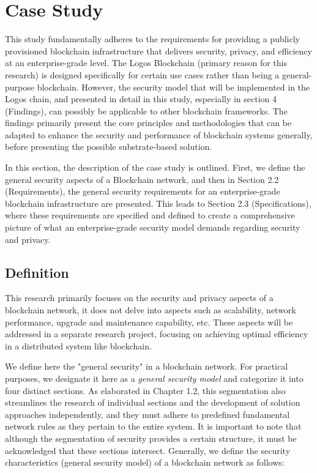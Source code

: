 \section{Case Study}
This study fundamentally adheres to the requirements for providing a publicly provisioned blockchain infrastructure that delivers security, privacy, and efficiency at an enterprise-grade level. The Logos Blockchain (primary reason for this research) is designed specifically for certain use cases rather than being a general-purpose blockchain. However, the security model that will be implemented in the Logos chain, and presented in detail in this study, especially in section 4 (Findings), can possibly be applicable to other blockchain frameworks. The findings primarily present the core principles and methodologies that can be adapted to enhance the security and performance of blockchain systems generally, before presenting the possible substrate-based solution.

In this section, the description of the case study is outlined. First, we define the general security aspects of a Blockchain network, and then in Section 2.2 (Requirements), the general security requirements for an enterprise-grade blockchain infrastructure are presented. This leads to Section 2.3 (Specifications), where these requirements are specified and defined to create a comprehensive picture of what an enterprise-grade security model demands regarding security and privacy.

\subsection{Definition}
This research primarily focuses on the security and privacy aspects of a blockchain network\cite{block_secure_blog}, it does not delve into aspects such as scalability, network performance, upgrade and maintenance capability, etc. These aspects will be addressed in a separate research project, focusing on achieving optimal efficiency in a distributed system like blockchain.

We define here the "general security" in a blockchain network. For practical purposes, we designate it here as a \textit{general security model} and categorize it into four distinct sections. As elaborated in Chapter 1.2, this segmentation also streamlines the research of individual sections and the development of solution approaches independently, and they must adhere to predefined fundamental network rules as they pertain to the entire system. It is important to note that although the segmentation of security provides a certain structure, it must be acknowledged that these sections intersect.
Generally, we define the security characteristics (general security model) of a blockchain network as follows:

